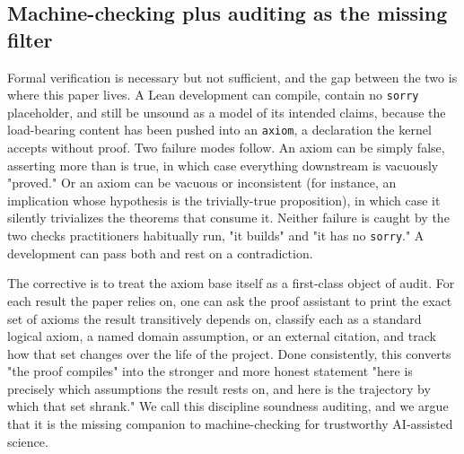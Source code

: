 \documentclass[11pt]{article}
\begin{document}
\subsection{Machine-checking plus auditing as the missing filter}

Formal verification is necessary but not sufficient, and the gap between the two is where this
paper lives. A Lean development can compile, contain no \texttt{sorry} placeholder, and still be unsound
as a model of its intended claims, because the load-bearing content has been pushed into an
\texttt{axiom}, a declaration the kernel accepts without proof. Two failure modes follow. An axiom can be
simply false, asserting more than is true, in which case everything downstream is vacuously
"proved." Or an axiom can be vacuous or inconsistent (for instance, an implication whose hypothesis
is the trivially-true proposition), in which case it silently trivializes the theorems that consume
it. Neither failure is caught by the two checks practitioners habitually run, "it builds" and "it
has no \texttt{sorry}." A development can pass both and rest on a contradiction.

The corrective is to treat the axiom base itself as a first-class object of audit. For each result
the paper relies on, one can ask the proof assistant to print the exact set of axioms the result
transitively depends on, classify each as a standard logical axiom, a named domain assumption, or
an external citation, and track how that set changes over the life of the project. Done
consistently, this converts "the proof compiles" into the stronger and more honest statement "here
is precisely which assumptions the result rests on, and here is the trajectory by which that set
shrank." We call this discipline soundness auditing, and we argue that it is the missing companion
to machine-checking for trustworthy AI-assisted science.

\begin{center}\end{center}
\end{document}
